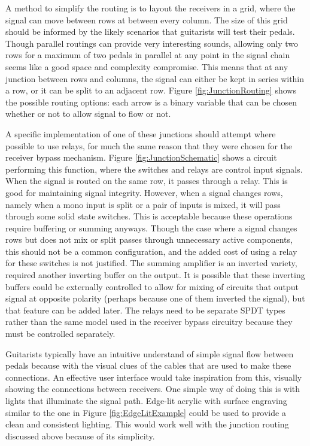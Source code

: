 \documentclass{article}
\begin{document}
		A method to simplify the routing is to layout the receivers in a grid, where the signal can move between rows at between every column.  The size of this grid should be informed by the likely scenarios that guitarists will test their pedals.  Though parallel routings can provide very interesting sounds, allowing only two rows for a maximum of two pedals in parallel at any point in the signal chain seems like a good space and complexity compromise.  This means that at any junction between rows and columns, the signal can either be kept in series within a row, or it can be split to an adjacent row.  Figure \ref{fig:JunctionRouting} shows the possible routing options: each arrow is a binary variable that can be chosen whether or not to allow signal to flow or not.

		A specific implementation of one of these junctions should attempt where possible to use relays, for much the same reason that they were chosen for the receiver bypass mechanism.  Figure \ref{fig:JunctionSchematic} shows a circuit performing this function, where the switches and relays are control input signals.  When the signal is routed on the same row, it passes through a relay.  This is good for maintaining signal integrity.  However, when a signal changes rows, namely when a mono input is split or a pair of inputs is mixed, it will pass through some solid state switches.  This is acceptable because these operations require buffering or summing anyways.  Though the case where a signal changes rows but does not mix or split passes through unnecessary active components, this should not be a common configuration, and the added cost of using a relay for these switches is not justified.  The summing amplifier is an inverted variety, required another inverting buffer on the output.  It is possible that these inverting buffers could be externally controlled to allow for mixing of circuits that output signal at opposite polarity (perhaps because one of them inverted the signal), but that feature can be added later.  The relays need to be separate SPDT types rather than the same model used in the receiver bypass circuitry because they must be controlled separately.

		Guitarists typically have an intuitive understand of simple signal flow between pedals because with the visual clues of the cables that are used to make these connections.  An effective user interface would take inspiration from this, visually showing the connections between receivers.  One simple way of doing this is with lights that illuminate the signal path.  Edge-lit acrylic with surface engraving similar to the one in Figure \ref{fig:EdgeLitExample} could be used to provide a clean and consistent lighting.  This would work well with the junction routing discussed above because of its simplicity.
\end{document}
